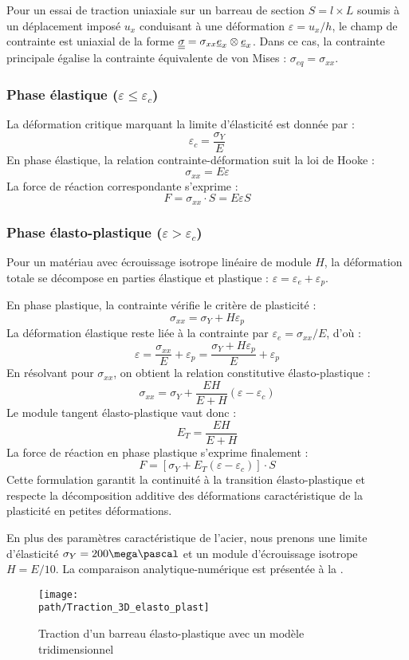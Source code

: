 \documentclass[10pt]{book}
\def\path{./fig}
\newcommand{\SigY}{\sigma_{Y}}
\begin{document}
Pour un essai de traction uniaxiale sur un barreau de section $S = l \times L$ soumis à un déplacement imposé $u_x$ conduisant à une déformation $\varepsilon = u_x/h$, le champ de contrainte est uniaxial de la forme $\underline{\underline{\sigma}} = \sigma_{xx}\underline{e}_x \otimes \underline{e}_x$. Dans ce cas, la contrainte principale égalise la contrainte équivalente de von Mises : $\sigma_{eq} = \sigma_{xx}$.
\subsubsection{Phase élastique ($\varepsilon \leq \varepsilon_c$)}
La déformation critique marquant la limite d'élasticité est donnée par :
$$\varepsilon_c = \frac{\sigma_Y}{E}$$
En phase élastique, la relation contrainte-déformation suit la loi de Hooke :
$$\sigma_{xx} = E\varepsilon$$
La force de réaction correspondante s'exprime :
$$F = \sigma_{xx} \cdot S = E\varepsilon S$$
\subsubsection{Phase élasto-plastique ($\varepsilon > \varepsilon_c$)}
Pour un matériau avec écrouissage isotrope linéaire de module $H$, la déformation totale se décompose en parties élastique et plastique : $\varepsilon = \varepsilon_e + \varepsilon_p$.

En phase plastique, la contrainte vérifie le critère de plasticité :
$$\sigma_{xx} = \sigma_Y + H\varepsilon_p$$
La déformation élastique reste liée à la contrainte par $\varepsilon_e = \sigma_{xx}/E$, d'où :
$$\varepsilon = \frac{\sigma_{xx}}{E} + \varepsilon_p = \frac{\sigma_Y + H\varepsilon_p}{E} + \varepsilon_p$$
En résolvant pour $\sigma_{xx}$, on obtient la relation constitutive élasto-plastique :
$$\sigma_{xx} = \sigma_Y + \frac{EH}{E+H}(\varepsilon - \varepsilon_c)$$
Le module tangent élasto-plastique vaut donc :
$$E_T = \frac{EH}{E+H}$$
La force de réaction en phase plastique s'exprime finalement :
$$F = \left[\sigma_Y + E_T(\varepsilon - \varepsilon_c)\right] \cdot S$$
Cette formulation garantit la continuité à la transition élasto-plastique et respecte la décomposition additive des déformations caractéristique de la plasticité en petites déformations.

En plus des paramètres caractéristique de l'acier, nous prenons une limite d'élasticité $\SigY = 200\mega\pascal$ et un module d'écrouissage isotrope $H=E/10$. La comparaison analytique-numérique est présentée à la .
\begin{figure}[h!]
\centering \texttt{[image: \\path/Traction\_3D\_elasto\_plast]}
\caption{Traction d'un barreau élasto-plastique avec un modèle tridimensionnel}
\label{fig:comparaison_SOD}
\end{figure}
\end{document}
